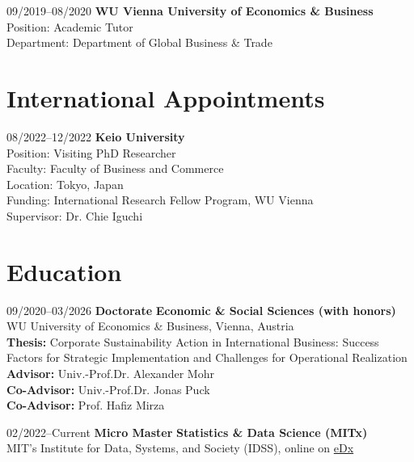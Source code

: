 \documentclass[11pt,a4paper]{article}
\begin{document}
\begin{cv}
\begin{cvlist}{}
    \item[09/2019--08/2020]
      {\textbf{WU Vienna University of Economics \& Business}}\\
      {Position:} Academic Tutor\\
      {Department:} Department of Global Business \& Trade\\
\end{cvlist}

\section{International Appointments}
\begin{cvlist}{}
    \item[08/2022--12/2022]
      {\textbf{Keio University}}\\
      {Position:} Visiting PhD Researcher\\
      {Faculty:} Faculty of Business and Commerce\\
      {Location:} Tokyo, Japan\\
      {Funding:} International Research Fellow Program, WU Vienna\\
      {Supervisor:} Dr. Chie Iguchi
\end{cvlist}

\section{Education}
\begin{cvlist}{}
  \item[09/2020--03/2026] 
      \textbf{Doctorate} {{\textbf{Economic \& Social Sciences (with honors)}}}\\
      WU University of Economics \& Business, Vienna, Austria\\
      \textbf{Thesis:} Corporate Sustainability Action in International Business: Success Factors for Strategic Implementation and Challenges for Operational Realization\\
      \textbf{Advisor:} {Univ.-Prof.Dr. Alexander Mohr}\\
      \textbf{Co-Advisor:} {Univ.-Prof.Dr. Jonas Puck}\\
      \textbf{Co-Advisor:} {Prof. Hafiz Mirza}
      
    \item[02/2022--Current] 
      \textbf{Micro Master} {{\textbf{Statistics \& Data Science (MITx)}}}\\
      MIT's Institute for Data, Systems, and Society (IDSS), online on \href{https://idss.mit.edu/academics/micromasters-program-in-statistics-and-data-science-sds/}{eDx}
      

\end{cvlist}
\end{cv}
\end{document}
